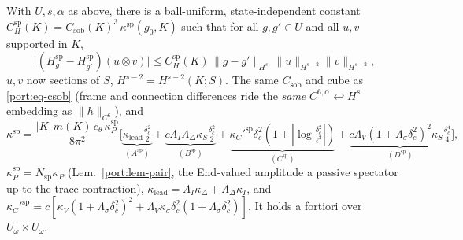 \begin{lemma}\label{lem:dirac-parametrix-ball}
With $U,s,\alpha$ as above, there is a ball-uniform, state-independent
constant $C_H^{\mathrm{sp}}(K)=C_{\mathrm{sob}}(K)^3\,\kappa^{\mathrm{sp}}
(g_0,K)$ such that for all $g,g'\in U$ and all $u,v$ supported in $K$,
\begin{equation}\label{dspin:eq-clausei}
  \bigl|(H^{\mathrm{sp}}_g-H^{\mathrm{sp}}_{g'})(u\otimes v)\bigr|
  \le C_H^{\mathrm{sp}}(K)\,\|g-g'\|_{H^s}\,\|u\|_{H^{s-2}}\|v\|_{H^{s-2}},
\end{equation}
$u,v$ now sections of $S$, $H^{s-2}=H^{s-2}(K;S)$. The same $C_{\mathrm{sob}}$
and cube as \eqref{port:eq-csob} (frame and connection differences ride the
\emph{same} $C^{6,\alpha}\hookleftarrow H^s$ embedding as $\|h\|_{C^6}$), and
\[
  \kappa^{\mathrm{sp}}=\frac{|K|\,m(K)\,c_\theta\,\kappa_P^{\mathrm{sp}}}{8\pi^2}
  \bigl[\underbrace{\kappa_{\mathrm{lead}}\tfrac{\delta_c^2}2}_{(A^{\mathrm{sp}})}
  +\underbrace{c\Lambda_I\Lambda_\Delta\kappa_S\tfrac{\delta_c^2}2}
  _{(B^{\mathrm{sp}})}
  +\underbrace{\kappa_C'^{\mathrm{sp}}\delta_c^2(1+|\log\tfrac{\delta_c^2}
  {\ell^2}|)}_{(C^{\mathrm{sp}})}
  +\underbrace{c\Lambda_V(1+\Lambda_\sigma\delta_c^2)^2\kappa_S
  \tfrac{\delta_c^4}4}_{(D^{\mathrm{sp}})}\bigr],
\]
$\kappa_P^{\mathrm{sp}}=N_{\mathrm{sp}}\kappa_P$ (Lem.~\ref{port:lem-pair}, the
End-valued amplitude a passive spectator up to the trace contraction),
$\kappa_{\mathrm{lead}}=\Lambda_I\kappa_\Delta+\Lambda_\Delta\kappa_I$, and
$\kappa_C'^{\mathrm{sp}}=c[\kappa_V(1+\Lambda_\sigma\delta_c^2)^2+\Lambda_V
\kappa_\sigma\delta_c^2(1+\Lambda_\sigma\delta_c^2)]$. It holds a fortiori over
$U_\omega\times U_\omega$.
\end{lemma}
